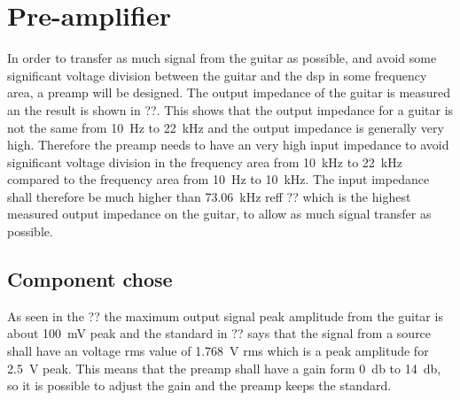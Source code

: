 \section{Pre-amplifier}
In order to transfer as much signal from the guitar as possible, and avoid some significant voltage division between the guitar and the \gls{dsp} in some frequency area, a \gls{preamp} will be designed. The output impedance of the guitar is measured an the result is shown in ??. This shows that the output impedance for a guitar is not the same from \SI{10}{\hertz} to \SI{22}{\kilo\hertz} and the output impedance is generally very high. Therefore the \gls{preamp} needs to have an very high input impedance to avoid significant voltage division in the frequency area from \SI{10}{\kilo\hertz} to \SI{22}{\kilo\hertz} compared to the frequency area from \SI{10}{\hertz} to \SI{10}{\kilo\hertz}. The input impedance shall therefore be much higher than \SI{73.06}{\kilo\hertz} reff ?? which is the highest measured output impedance on the guitar, to allow as much signal transfer as possible.

\subsection{Component chose}

As seen in the ?? the maximum output signal peak amplitude from the guitar is about \SI{100}{\milli\volt} peak and the standard in ?? says that the signal from a source shall have an voltage \gls{rms} value of \SI{1.768}{\volt} \gls{rms} which is a peak amplitude for \SI{2.5}{\volt} peak. This means that the \gls{preamp} shall have a gain form \SI{0}{\decibel} to \SI{14}{\decibel}, so it is possible to adjust the gain and the \gls{preamp} keeps the standard. 